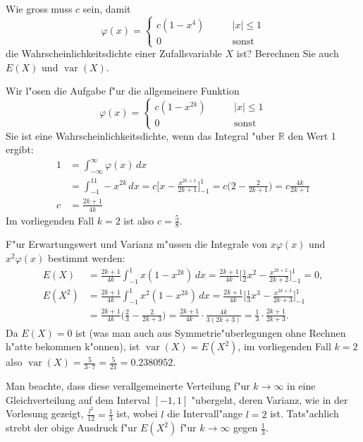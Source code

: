 Wie gross muss $c$ sein, damit
\[
\varphi(x)=\begin{cases}
c(1-x^4)\qquad&|x|\le 1\\
0&\text{sonst}
\end{cases}
\]
die Wahrscheinlichkeitsdichte einer Zufallsvariable $X$ ist? Berechnen 
Sie auch $E(X)$ und $\operatorname{var}(X)$.

\begin{loesung}
Wir l"osen die Aufgabe f"ur die allgemeinere Funktion
\[
\varphi(x)=\begin{cases}
c(1-x^{2k})\qquad&|x|\le 1\\
0&\text{sonst}
\end{cases}
\]
Sie ist eine Wahrscheinlichkeitsdichte, wenn das Integral "uber $\mathbb R$
den Wert 1 ergibt:
\begin{align*}
1&=\int_{-\infty}^{\infty}\varphi(x)\,dx
\\
&=
\int_{-1}^11-x^{2k}\,dx=c\biggl[x-\frac{x^{2k+1}}{2k+1}\biggr]_{-1}^1
=c\biggl(2-\frac{2}{2k+1}\biggr)=c\frac{4k}{2k+1}
\\
c&=\frac{2k+1}{4k}
\end{align*}
Im vorliegenden Fall $k=2$ ist also $c=\frac{5}{8}$.

F"ur Erwartungswert und Varianz m"ussen die Integrale von 
$x\varphi(x)$ und $x^2\varphi(x)$ bestimmt werden:
\begin{align*}
E(X)
&=
\frac{2k+1}{4k}
\int_{-1}^1x(1-x^{2k})\,dx
=
\frac{2k+1}{4k}
\biggl[
\frac12x^2-\frac{x^{2k+2}}{2k+2}
\biggr]_{-1}^1=0,
\\
E(X^2)
&=
\frac{2k+1}{4k}\int_{-1}^1x^2(1-x^{2k})\,dx
=
\frac{2k+1}{4k}
\biggl[
\frac13x^3-\frac{x^{2k+3}}{2k+3}
\biggr]_{-1}^1
\\
&=
\frac{2k+1}{4k}
\biggl(
\frac23-\frac{2}{2k+3}
\biggr)
=
\frac{2k+1}{4k}
\cdot
\frac{4k}{3(2k+3)}
=
\frac13\cdot
\frac{2k+1}{2k+3}.
\end{align*}
Da $E(X)=0$ ist (was man auch aus Symmetrie"uberlegungen ohne
Rechnen h"atte bekommen k"onnen), ist $\operatorname{var}(X)=E(X^2)$,
im vorliegenden Fall $k=2$ also 
$\operatorname{var}(X)=\frac{5}{3\cdot 7}=\frac{5}{21}=0.2380952$.

Man beachte, dass diese verallgemeinerte Verteilung f"ur $k\to\infty$
in eine Gleichverteilung auf dem Interval $[-1,1]$ "ubergeht, deren
Varianz, wie in der Vorlesung gezeigt, $\frac{l^2}{12}=\frac13$ ist, wobei
$l$ die Intervall"ange $l=2$ ist. Tats"achlich strebt der obige 
Ausdruck f"ur $E(X^2)$ f"ur $k\to\infty$ gegen $\frac13$.
\end{loesung}
